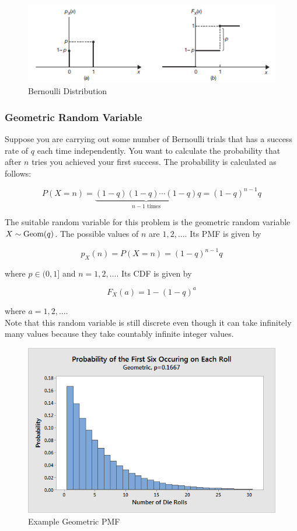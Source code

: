 \begin{figure}[H]
	\centering
	\includegraphics[width=120mm]{6.png}
	\caption{Bernoulli Distribution}
\end{figure}

\subsubsection{Geometric Random Variable}

Suppose you are carrying out some number of Bernoulli trials that has a success rate of $q$ each time independently. You want to calculate the probability that after $n$ tries you achieved your first success. The probability is calculated as follows:

$$P(X=n)= \underbrace{ (1-q)(1-q) \cdots (1-q) }_{ \text{$n-1$ times} } q=(1-q)^{n-1} q$$

The suitable random variable for this problem is the geometric random variable $X \sim \operatorname{Geom} (q)$. The possible values of $n$ are $1, 2, \dots$. Its PMF is given by

$$p_X(n)=P(X=n)=(1-q)^{n-1} q$$

where $p\in(0,1]$ and $n=1, 2,\dots$. Its CDF is given by

$$F_X(a)=1-(1-q)^a$$

where $a=1, 2,\dots$. \\

Note that this random variable is still discrete even though it can take infinitely many values because they take countably infinite integer values.

\begin{figure}[H]
	\centering
	\includegraphics[width=120mm]{7.png}
	\caption{Example Geometric PMF}
\end{figure}


